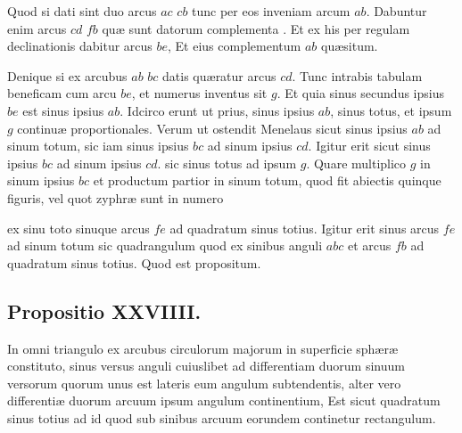\documentclass[11pt,a4paper]{article}
\begin{document}
Quod si dati
sint duo arcus $ac$ $cb$ tunc per eos inveniam arcum $ab$. Dabuntur
enim arcus $cd$ $fb$ quæ sunt datorum complementa . Et ex his per regulam declinationis
dabitur arcus $be$, Et eius complementum $ab$ quæsitum.

Denique
si ex arcubus $ab$ $bc$ datis quæratur arcus $cd$. Tunc intrabis tabulam
beneficam cum arcu $be$, et numerus inventus sit $g$. Et quia
sinus secundus ipsius $be$ est sinus ipsius $ab$. Idcirco erunt ut
prius, sinus ipsius $ab$, sinus totus, et ipsum $g$ continuæ
proportionales. Verum ut ostendit Menelaus sicut sinus
ipsius $ab$ ad sinum totum, sic iam sinus ipsius $bc$ ad sinum
ipsius $cd$. Igitur erit sicut sinus ipsius $bc$ ad sinum
ipsius $cd$. sic sinus totus ad ipsum $g$. Quare multiplico
$g$ in sinum ipsius $bc$ et productum partior in sinum totum,
quod fit abiectis quinque figuris, vel quot zyphræ sunt in numero

ex sinu toto sinuque arcus $fe$ ad quadratum sinus totius. Igitur
erit sinus arcus $fe$ ad sinum totum sic quadrangulum quod
ex sinibus anguli $abc$ et arcus $fb$ ad quadratum sinus totius.
Quod est propositum.

\subsection*{Propositio XXVIIII.}

In omni triangulo ex arcubus circulorum majorum
in superficie sphæræ constituto, sinus versus anguli cuiuslibet
ad differentiam duorum sinuum versorum quorum unus
est lateris eum angulum subtendentis, alter vero differentiæ
duorum arcuum ipsum angulum continentium, Est sicut
quadratum sinus totius ad id quod sub sinibus arcuum
eorundem continetur rectangulum.
\end{document}
